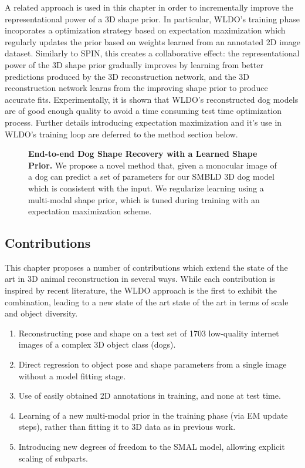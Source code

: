 A related approach is used in this chapter in order to incrementally improve the representational power of a 3D shape prior. In particular, WLDO's training phase incoporates a optimization strategy based on expectation maximization which regularly updates the prior based on weights learned from an annotated 2D image dataset. Similarly to SPIN, this creates a collaborative effect: the representational power of the 3D shape prior gradually improves by learning from better predictions produced by the 3D reconstruction network, and the 3D reconstruction network learns from the improving shape prior to produce accurate fits. Experimentally, it is shown that WLDO's reconstructed dog models are of good enough quality to avoid a time consuming test time optimization process. Further details introducing expectation maximization and it's use in WLDO's training loop are deferred to the method section below.


\begin{figure}[t]
\medbreak
\caption{
\textbf{End-to-end Dog Shape Recovery with a Learned Shape Prior.}
We propose a novel method that, given a monocular image of a dog can predict a set of parameters for our SMBLD 3D dog model which is consistent with the input. We regularize learning using a multi-modal shape prior, which is tuned during training with an expectation maximization scheme.\label{fig:splash}}
\end{figure}

\subsection{Contributions}

This chapter proposes a number of contributions which extend the state of the art in 3D animal reconstruction in several ways. While each contribution is inspired by recent literature, the WLDO approach is the first to exhibit the combination, leading to a new state of the art state of the art in terms of scale and object diversity.

\begin{enumerate}
    \item Reconstructing pose and shape on a test set of 1703 low-quality internet images of a complex 3D object class (dogs).
    \item Direct regression to object pose and shape parameters from a single image without a model fitting stage.
    \item Use of easily obtained 2D annotations in training, and none at test time.
    \item Learning of a new multi-modal prior in the training phase (via EM update steps), rather than fitting it to 3D data as in previous work.
    \item Introducing new degrees of freedom to the SMAL model, allowing explicit scaling of subparts.
\end{enumerate}

